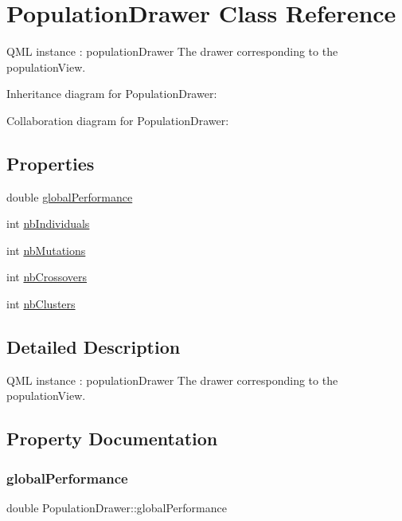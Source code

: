 \hypertarget{class_population_drawer}{}\section{Population\+Drawer Class Reference}
\label{class_population_drawer}


Q\+ML instance \+: population\+Drawer The drawer corresponding to the population\+View.  




Inheritance diagram for Population\+Drawer\+:


Collaboration diagram for Population\+Drawer\+:
\subsection*{Properties}
\begin{DoxyCompactItemize}
\item 
double \hyperlink{class_population_drawer_ace13431d21d20767a0dfb5f96352d49c}{global\+Performance}
\item 
int \hyperlink{class_population_drawer_af20bdfe73e9bda7aba2257a101771071}{nb\+Individuals}
\item 
int \hyperlink{class_population_drawer_ae31d2743689e0cca64420d05fa120bda}{nb\+Mutations}
\item 
int \hyperlink{class_population_drawer_acb640608b088ecc9fe64fb31bc00f91e}{nb\+Crossovers}
\item 
int \hyperlink{class_population_drawer_ab4a61ab4b7eec14ea88057d1673ec424}{nb\+Clusters}
\end{DoxyCompactItemize}


\subsection{Detailed Description}
Q\+ML instance \+: population\+Drawer The drawer corresponding to the population\+View. 

\subsection{Property Documentation}
\mbox{\label{class_population_drawer_ace13431d21d20767a0dfb5f96352d49c}} 
\subsubsection{\texorpdfstring{global\+Performance}{globalPerformance}}
{\footnotesize\ttfamily double Population\+Drawer\+::global\+Performance}

